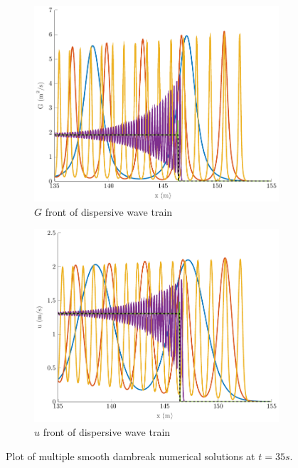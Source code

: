 \documentclass[10pt]{elsarticle}
\begin{document}
\begin{figure}
\begin{subfigure}{0.32\textwidth}
		\includegraphics[width=\textwidth]{./Figures/Simulations/Study/Serre2SWWECloser/GFront.pdf}
		\caption{$G$ front of dispersive wave train}
	\end{subfigure}
	\begin{subfigure}{0.32\textwidth}
		\centering
		\includegraphics[width=\textwidth]{./Figures/Simulations/Study/Serre2SWWECloser/uFront.pdf}
		\caption{$u$ front of dispersive wave train}
	\end{subfigure}
	\caption{Plot of multiple smooth dambreak numerical solutions at $t=35s$.}
\end{figure}
\end{document}
